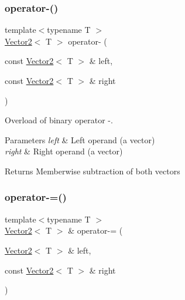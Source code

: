 \subsubsection{\texorpdfstring{operator-\/()}{operator-()}\hspace{0.1cm}{\footnotesize\ttfamily [2/2]}}
{\footnotesize\ttfamily template$<$typename T $>$ \\
\hyperlink{classsf_1_1_vector2}{Vector2}$<$ T $>$ operator-\/ (\begin{DoxyParamCaption}\item[{const \hyperlink{classsf_1_1_vector2}{Vector2}$<$ T $>$ \&}]{left,  }\item[{const \hyperlink{classsf_1_1_vector2}{Vector2}$<$ T $>$ \&}]{right }\end{DoxyParamCaption})\hspace{0.3cm}{\ttfamily [related]}}



Overload of binary operator -\/. 


\begin{DoxyParams}{Parameters}
{\em left} & Left operand (a vector) \\
\hline
{\em right} & Right operand (a vector)\\
\hline
\end{DoxyParams}
\begin{DoxyReturn}{Returns}
Memberwise subtraction of both vectors 
\end{DoxyReturn}
\mbox{\label{classsf_1_1_vector2_a30a5a12ad03c9a3a982a0a313bf84e6f}} 
\subsubsection{\texorpdfstring{operator-\/=()}{operator-=()}}
{\footnotesize\ttfamily template$<$typename T $>$ \\
\hyperlink{classsf_1_1_vector2}{Vector2}$<$ T $>$ \& operator-\/= (\begin{DoxyParamCaption}\item[{\hyperlink{classsf_1_1_vector2}{Vector2}$<$ T $>$ \&}]{left,  }\item[{const \hyperlink{classsf_1_1_vector2}{Vector2}$<$ T $>$ \&}]{right }\end{DoxyParamCaption})\hspace{0.3cm}{\ttfamily [related]}}



